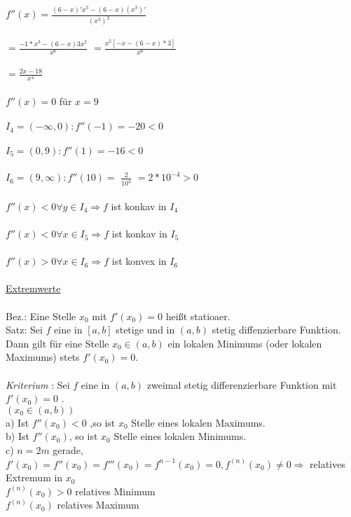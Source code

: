 \documentclass[14pt,a4paper]{article}
\begin{document}
$
f''(x) = ${\large $ \frac{ \left( 6 - x \right)' x^3 -  \left( 6 - x \right) \left( x^3 \right) ' }{ \left(x^3 \right) ^2} $ } \\\\ $ = ${\large $ \frac{-1 * x^3 - \left(6-x\right) 3x^2}{x^6} $ } $ = ${\large $\frac{x^2[-x-\left(6-x\right)*3]}{x^6}$} \\\\ $ = ${\large $\frac{2x-18}{x^4} $ } \\\\ $ f''(x) = 0 $ \quad für $ x = 9 $ \\\\
$ I_4 = (- \infty, 0 ) : f''(-1)=-20 < 0 $ \\\\ $
I_5 = (0,9) : f''(1) = -16 < 0 $ \\\\ $
I_6 = (9, \infty) : f''(10) = $ {\large $\frac{2}{10^4}$ }$ = 2 * 10^{-4} > 0 $ \\\\ $ 
f''(x) < 0 $\quad $\forall y \in I_4 \Rightarrow f $ ist konkav in $ I_4 $ \\\\ $ f''(x)<0 $\quad$ \forall x \in I_5 \Rightarrow f $ ist konkav in $ I_5 $ \\\\ $  f''(x) > 0 $\quad$ \forall x \in I_6 \Rightarrow f $ ist konvex in $ I_6 $ \\\\ 
\underline{Extremwerte} \\\\ 
Bez.: Eine Stelle $ x_0 $ mit $ f'(x_0) = 0 $ heißt statioaer. \\
Satz: Sei $ f $ eine in $ [a,b] $ stetige und in $ (a,b) $ stetig diffenzierbare Funktion.\\
Dann gilt für eine Stelle $ x_0 \in (a,b) $ ein lokalen Minimums (oder lokalen Maximums) stets $ f'(x_0) = 0$.\\\\
\textit{Kriterium} : 
Sei $f$ eine in $(a,b) $ zweimal stetig differenzierbare Funktion mit $ f'(x_0) = 0$ . \\
$\left(x_0 \in (a,b)\right) $\\ a) Ist $ f''(x_0) <0$ ,so ist $ x_0 $ Stelle eines lokalen Maximums. \\ b)
Ist $ f''(x_0)$, so ist $ x_0 $ Stelle eines lokalen Minimums. \\ c)
$ n=2 m$ gerade, $f'(x_0)=f''(x_0)=f'''(x_0)=f^{n-1}(x_0) = 0, f^{(n)}(x_0) \neq 0 \Rightarrow $ relatives Extremum in $ x_0 $ \\ $ f^{(n)} (x_0) > 0 $ relatives Minimum \\$ f^{(n)}(x_0) $ relatives Maximum \\\\
\end{document}

